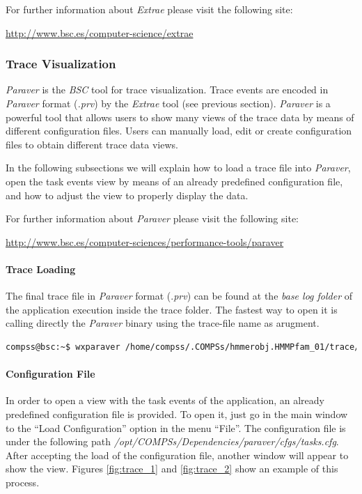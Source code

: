 For further information about \textit{Extrae} please visit the following site: 
\begin{center}
\url{http://www.bsc.es/computer-science/extrae} 
\end{center}


\subsubsection{Trace Visualization}
\label{subsubsec:paraver}
\textit{Paraver} is the \textit{BSC} tool for trace visualization. Trace events are encoded in \textit{Paraver} format (\textit{.prv}) 
by the \textit{Extrae} tool (see previous section). \textit{Paraver} is a powerful tool that allows users to show many 
views of the trace data by means of different configuration files. Users can manually load, edit or create configuration files to
obtain different trace data views. 

In the following subsections we will explain how to load a trace file into \textit{Paraver}, open the task 
events view by means of an already predefined configuration file, and how to 
adjust the view to properly display the data.

For further information about \textit{Paraver} please visit the following site:
\begin{center}
\url{http://www.bsc.es/computer-sciences/performance-tools/paraver}
\end{center}

\paragraph{Trace Loading}
The final trace file in \textit{Paraver} format (.\textit{prv}) can be found at the \textit{base log folder} of the application
execution inside the trace folder. The fastest way to open it is calling directly the \textit{Paraver} binary using the trace-file name
as arugment.
\begin{lstlisting}[language=bash]
compss@bsc:~$ wxparaver /home/compss/.COMPSs/hmmerobj.HMMPfam_01/trace/*.prv
\end{lstlisting}
 
\paragraph{Configuration File}
In order to open a view with the task events of the application, an already predefined configuration 
file is provided. To open it, just go in the main window to the ``Load Configuration'' option in 
the menu ``File''. The configuration file is under the following path \textit{/opt/COMPSs/Dependencies/paraver/cfgs/tasks.cfg}. 
After accepting the load of the configuration file, another window will appear to show the view. Figures \ref{fig:trace_1} and
\ref{fig:trace_2} show an example of this process.

